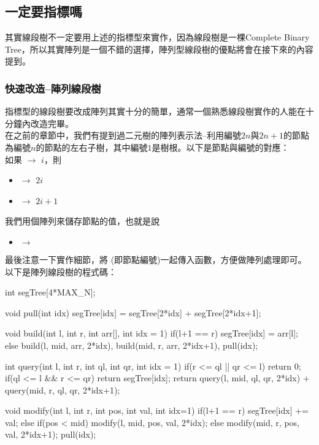 \documentclass[main.tex]{subfiles}
\begin{document}
\subsection{一定要指標嗎}

其實線段樹不一定要用上述的指標型來實作，因為線段樹是一棵Complete Binary Tree，所以其實陣列是一個不錯的選擇，陣列型線段樹的優點將會在接下來的內容提到。

\subsubsection{快速改造--陣列線段樹}

指標型的線段樹要改成陣列其實十分的簡單，通常一個熟悉線段樹實作的人能在十分鐘內改造完畢。\\

在之前的章節中，我們有提到過二元樹的陣列表示法--利用編號$2n$與$2n+1$的節點為編號$n$的節點的左右子樹，其中編號$1$是樹根。以下是節點與編號的對應：\\

如果  $\rightarrow$ $i$，則
\begin{itemize}
\item {} $\rightarrow$ $2i$
\item {} $\rightarrow$ $2i+1$
\end{itemize}

我們用個陣列來儲存節點的值，也就是說

\begin{itemize}
\item {} $\rightarrow$ 
\end{itemize}

最後注意一下實作細節，將  (即節點編號)一起傳入函數，方便做陣列處理即可。\\

以下是陣列線段樹的程式碼：\\

\begin{C++}
int segTree[4*MAX_N];

void pull(int idx){
    segTree[idx] = segTree[2*idx] + segTree[2*idx+1];
}

void build(int l, int r, int arr[], int idx = 1){
    if(l+1 == r) segTree[idx] = arr[l];
    else build(l, mid, arr, 2*idx), 
        build(mid, r, arr, 2*idx+1), pull(idx);
}

int query(int l, int r, int ql, int qr, int idx = 1){
    if(r <= ql || qr <= l) return 0;
    if(ql <= l && r <= qr) return segTree[idx];
    return query(l, mid, ql, qr, 2*idx) + 
           query(mid, r, ql, qr, 2*idx+1);
}

void modify(int l, int r, int pos, int val, int idx=1){
    if(l+1 == r) segTree[idx] += val;
    else if(pos < mid) modify(l, mid, pos, val, 2*idx);
    else modify(mid, r, pos, val, 2*idx+1);
    pull(idx);
}
\end{C++}
\end{document}
